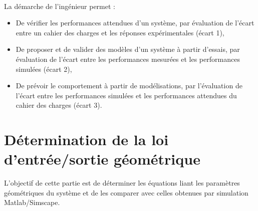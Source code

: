 

 \\

\graphicspath{{../../../img/}}
\begin{center}
\def\svgwidth{\columnwidth}

\end{center}

La démarche de l’ingénieur permet :
\begin{itemize}
 \item De vérifier les performances attendues d’un système, par évaluation de l’écart entre un cahier des charges et les réponses expérimentales (écart 1),
 \item De proposer et de valider des modèles d’un système à partir d’essais, par évaluation de l’écart entre les performances mesurées et les performances simulées (écart 2),
 \item De prévoir le comportement à partir de modélisations, par l’évaluation de l’écart entre les performances simulées et les performances attendues du cahier des charges (écart 3).
\end{itemize}


\newpage

\section{Détermination de la loi d'entrée/sortie géométrique}

L'objectif de cette partie est de déterminer les équations liant les paramètres géométriques du système \systemes et de les comparer avec celles obtenues par simulation Matlab/Simscape.

\graphicspath{{"../../../Systemes/\systemessansaccent/"}}

\begin{center}
\def\svgwidth{\columnwidth}

\end{center}


